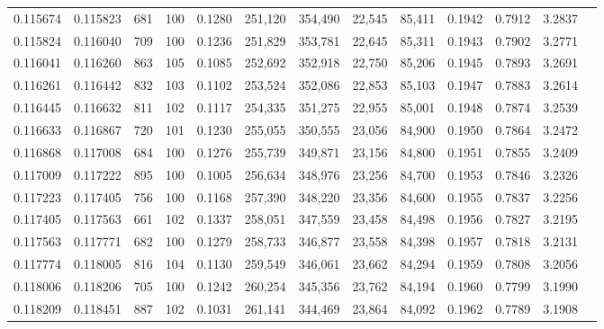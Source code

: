 \begin{tabular}{rrrrrrrrrrrrr}
0.115674 & 0.115823 &   681 & 100 &                                     0.1280 & 251,120 & 354,490 &  22,545 &  85,411 & 0.1942 & 0.7912 & 3.2837 \\
0.115824 & 0.116040 &   709 & 100 &                                     0.1236 & 251,829 & 353,781 &  22,645 &  85,311 & 0.1943 & 0.7902 & 3.2771 \\
0.116041 & 0.116260 &   863 & 105 &                                     0.1085 & 252,692 & 352,918 &  22,750 &  85,206 & 0.1945 & 0.7893 & 3.2691 \\
0.116261 & 0.116442 &   832 & 103 &                                     0.1102 & 253,524 & 352,086 &  22,853 &  85,103 & 0.1947 & 0.7883 & 3.2614 \\
0.116445 & 0.116632 &   811 & 102 &                                     0.1117 & 254,335 & 351,275 &  22,955 &  85,001 & 0.1948 & 0.7874 & 3.2539 \\
0.116633 & 0.116867 &   720 & 101 &                                     0.1230 & 255,055 & 350,555 &  23,056 &  84,900 & 0.1950 & 0.7864 & 3.2472 \\
0.116868 & 0.117008 &   684 & 100 &                                     0.1276 & 255,739 & 349,871 &  23,156 &  84,800 & 0.1951 & 0.7855 & 3.2409 \\
0.117009 & 0.117222 &   895 & 100 &                                     0.1005 & 256,634 & 348,976 &  23,256 &  84,700 & 0.1953 & 0.7846 & 3.2326 \\
0.117223 & 0.117405 &   756 & 100 &                                     0.1168 & 257,390 & 348,220 &  23,356 &  84,600 & 0.1955 & 0.7837 & 3.2256 \\
0.117405 & 0.117563 &   661 & 102 &                                     0.1337 & 258,051 & 347,559 &  23,458 &  84,498 & 0.1956 & 0.7827 & 3.2195 \\
0.117563 & 0.117771 &   682 & 100 &                                     0.1279 & 258,733 & 346,877 &  23,558 &  84,398 & 0.1957 & 0.7818 & 3.2131 \\
0.117774 & 0.118005 &   816 & 104 &                                     0.1130 & 259,549 & 346,061 &  23,662 &  84,294 & 0.1959 & 0.7808 & 3.2056 \\
0.118006 & 0.118206 &   705 & 100 &                                     0.1242 & 260,254 & 345,356 &  23,762 &  84,194 & 0.1960 & 0.7799 & 3.1990 \\
0.118209 & 0.118451 &   887 & 102 &                                     0.1031 & 261,141 & 344,469 &  23,864 &  84,092 & 0.1962 & 0.7789 & 3.1908 \\

\end{tabular}
